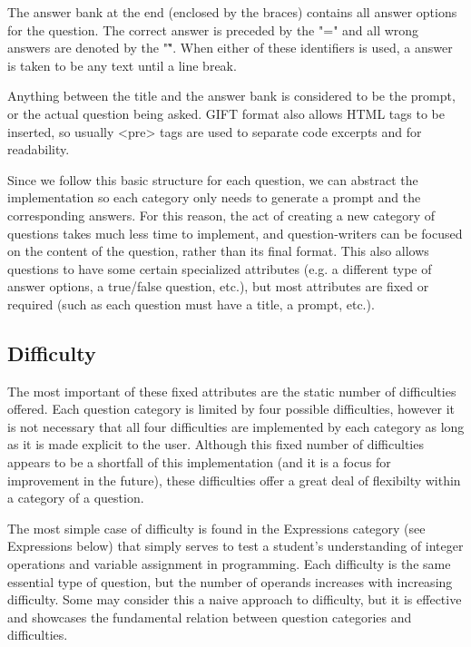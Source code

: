 \documentclass{article}
\begin{document}
The answer bank at the end (enclosed by the braces) contains all answer options for the question. The correct answer is preceded by the "=" and all wrong answers are denoted by
the "\~". When either of these identifiers is used, a answer is taken to be any text until a line break.

Anything between the title and the answer bank is
considered to be the prompt, or the actual question being asked. GIFT format also allows HTML tags to be inserted,
so usually <pre> tags are used to separate code excerpts and for readability.

Since we follow this basic structure for each question, we can abstract the implementation so each category
only needs to generate a prompt and the corresponding answers. For this reason, the act of creating a new
category of questions takes much less time to implement, and question-writers can be focused on the content of
the question, rather than its final format. This also allows questions to have some certain specialized attributes
(e.g. a different type of answer options, a true/false question, etc.), but most attributes are fixed or required (such as each question
must have a title, a prompt, etc.).

\subsection{Difficulty}

The most important of these fixed attributes are the static number of difficulties offered. Each question category is
limited by four possible difficulties, however it is not necessary that all four difficulties are implemented by each category
as long as it is made explicit to the user. Although this fixed number of difficulties appears to be a shortfall of this
implementation (and it is a focus for improvement in the future), these difficulties offer a great deal of flexibilty
within a category of a question.

The most simple case of difficulty is found in the Expressions category (see Expressions below)
that simply serves to test a student's understanding of integer operations and variable assignment in programming.
Each difficulty is the same essential type of question, but the number of operands increases with increasing difficulty.
Some may consider this a naive approach to difficulty, but it is effective and showcases the fundamental relation
between question categories and difficulties.
\end{document}
